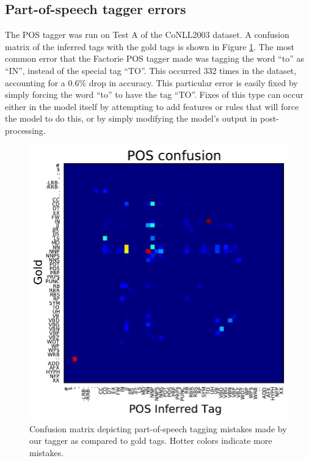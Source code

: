 \documentclass[12pt]{article}
\begin{document}
\subsection{Part-of-speech tagger errors}
The POS tagger was run on Test A of the CoNLL2003 dataset. A confusion matrix of the inferred tags with the gold tags is shown in Figure \ref{posconfusion}. The most common error that the Factorie POS tagger made was tagging the word ``to'' as ``IN'', instead of the special tag ``TO''. This occurred 332 times in the dataset, accounting for a 0.6\% drop in accuracy. This particular error is easily fixed by simply forcing the word ``to'' to have the tag ``TO''. Fixes of this type can occur either in the model itself by attempting to add features or rules that will force the model to do this, or by simply modifying the model’s output in post-processing.
\begin{figure}[!ht]
\begin{center}
\includegraphics[scale=1.0]{pos_output.pdf}
\caption{Confusion matrix depicting part-of-speech tagging mistakes made by our tagger as compared to gold tags. Hotter colors indicate more mistakes. \label{posconfusion}}
\end{center}
\end{figure}
\end{document}
